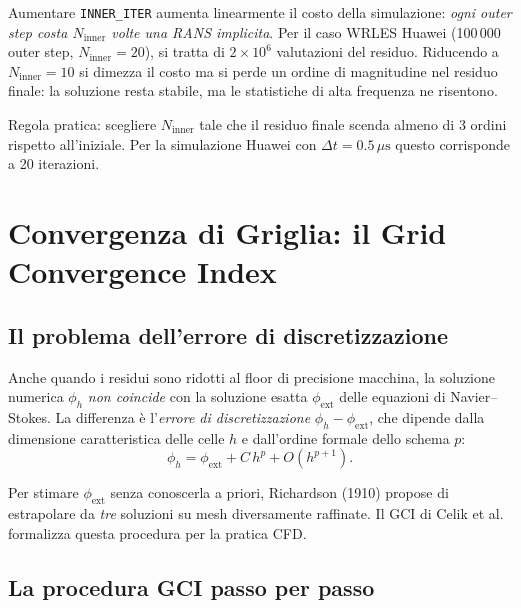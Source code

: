 \documentclass[11pt,a4paper]{article}
\newcommand{\ttcfg}[1]{\texttt{\color{codegray}#1}}
\newcommand{\mus}{\,\mu\mathrm{s}}
\begin{document}
\begin{warnbox}
Aumentare \ttcfg{INNER\_ITER} aumenta linearmente il costo della
simulazione: \emph{ogni outer step costa $N_{\mathrm{inner}}$ volte
una RANS implicita}. Per il caso WRLES Huawei (100\,000 outer step,
$N_{\mathrm{inner}}=20$), si tratta di $2\times 10^6$ valutazioni del
residuo. Riducendo a $N_{\mathrm{inner}}=10$ si dimezza il costo
ma si perde un ordine di magnitudine nel residuo finale: la
soluzione resta stabile, ma le statistiche di alta frequenza ne
risentono.

Regola pratica: scegliere $N_{\mathrm{inner}}$ tale che il residuo
finale scenda almeno di 3 ordini rispetto all'iniziale. Per la
simulazione Huawei con $\Delta t = 0.5\mus$ questo corrisponde a
20 iterazioni.
\end{warnbox}

\section{Convergenza di Griglia: il Grid Convergence Index}
\label{sec:gci}

\subsection{Il problema dell'errore di discretizzazione}

Anche quando i residui sono ridotti al floor di precisione macchina,
la soluzione numerica $\phi_h$ \emph{non coincide} con la soluzione
esatta $\phi_{\mathrm{ext}}$ delle equazioni di Navier--Stokes. La
differenza è l'\emph{errore di discretizzazione} $\phi_h -
\phi_{\mathrm{ext}}$, che dipende dalla dimensione caratteristica
delle celle $h$ e dall'ordine formale dello schema $p$:
\begin{equation}
  \phi_h = \phi_{\mathrm{ext}} + C\,h^p + O(h^{p+1}).
\end{equation}

Per stimare $\phi_{\mathrm{ext}}$ senza conoscerla a priori, Richardson
(1910) propose di estrapolare da \emph{tre} soluzioni su mesh
diversamente raffinate. Il GCI di Celik et al.~\cite{Celik2008}
formalizza questa procedura per la pratica CFD.

\subsection{La procedura GCI passo per passo}
\end{document}
